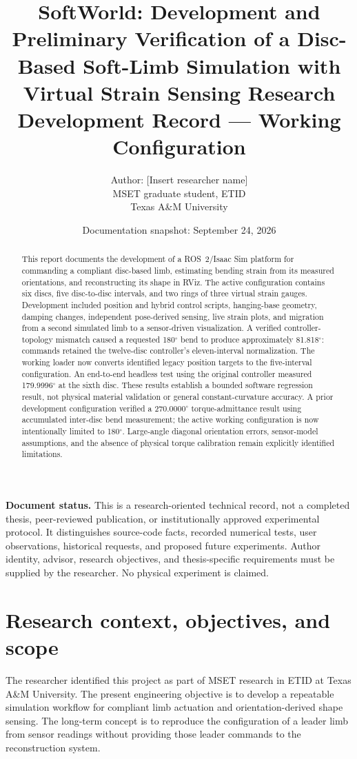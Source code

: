 \documentclass[11pt,letterpaper]{article}
\title{SoftWorld: Development and Preliminary Verification of a\newline
  Disc-Based Soft-Limb Simulation with Virtual Strain Sensing\newline
  \large Research Development Record --- Working Configuration}
\author{Author: [Insert researcher name]\\
  MSET graduate student, ETID\\Texas A\&M University}
\date{Documentation snapshot: September 24, 2026}
\newcommand{\degrees}{\ensuremath{^{\circ}}}
\begin{document}
\maketitle
\begin{abstract}
This report documents the development of a ROS~2/Isaac Sim platform for
commanding a compliant disc-based limb, estimating bending strain from its
measured orientations, and reconstructing its shape in RViz. The active
configuration contains six discs, five disc-to-disc intervals, and two rings
of three virtual strain gauges. Development included position and hybrid
control scripts, hanging-base geometry, damping changes, independent
pose-derived sensing, live strain plots, and migration from a second simulated
limb to a sensor-driven visualization. A verified controller-topology mismatch
caused a requested 180\degrees{} bend to produce approximately 81.818\degrees{}:
commands retained the twelve-disc controller's eleven-interval normalization.
The working loader now converts identified legacy position targets to the
five-interval configuration. An end-to-end headless test using the original
controller measured 179.9996\degrees{} at the sixth disc. These results establish
a bounded software regression result, not physical material validation or
general constant-curvature accuracy. A prior development configuration verified
a 270.0000\degrees{} torque-admittance result using accumulated inter-disc bend
measurement; the active working configuration is now intentionally limited to
180\degrees{}. Large-angle diagonal orientation errors,
sensor-model assumptions, and the absence of physical torque calibration
remain explicitly identified limitations.
\end{abstract}

\noindent\textbf{Document status.} This is a research-oriented technical record,
not a completed thesis, peer-reviewed publication, or institutionally approved
experimental protocol. It distinguishes source-code facts, recorded numerical
tests, user observations, historical requests, and proposed future experiments.
Author identity, advisor, research objectives, and thesis-specific requirements
must be supplied by the researcher. No physical experiment is claimed.

\tableofcontents
\newpage

\section{Research context, objectives, and scope}
The researcher identified this project as part of MSET research in ETID at
Texas A\&M University. The present engineering objective is to develop a
repeatable simulation workflow for compliant limb actuation and
orientation-derived shape sensing. The long-term concept is to reproduce the
configuration of a leader limb from sensor readings without providing those
leader commands to the reconstruction system.
\end{document}
